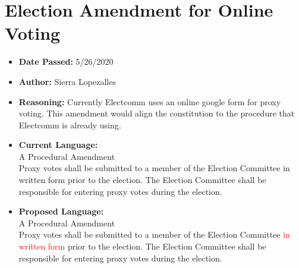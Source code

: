\documentclass[10pt]{article} %
\begin{document}
\section{Election Amendment for Online Voting}
\begin{itemize}
	\item \textbf{Date Passed:} 5/26/2020
	\item \textbf{Author:} Sierra Lopezalles
	\item \textbf{Reasoning:} Currently Electcomm uses an online google form for proxy voting. This amendment would align the constitution to the procedure that Electcomm is already using.
	\item \textbf{Current Language:} \\
	A Procedural Amendment \\
	Proxy votes shall be submitted to a member of the Election Committee in written form prior to the election. The Election Committee shall be responsible for entering proxy votes during the election.
	\item \textbf{Proposed Language:} \\
	A Procedural Amendment \\
	Proxy votes shall be submitted to a member of the Election Committee \textcolor{red}{in written form} prior to the election. The Election Committee shall be responsible for entering proxy votes during the election. 
\end{itemize}
\end{document}
